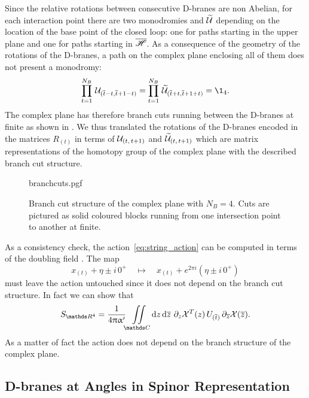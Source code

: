 Since the relative rotations between consecutive D-branes are non Abelian, for each interaction point there are two monodromies \cU and $\widetilde{\mathcal{U}}$ depending on the location of the base point of the closed loop: one for paths starting in the upper plane \ccH and one for paths starting in $\overline{\mathscr{H}}$.
As a consequence of the geometry of the rotations of the D-branes, a path on the complex plane enclosing all of them does not present a monodromy:
\begin{equation}
  \finiteprod{t}{1}{N_B}\,
  \cU_{(\bart - t, \bart + 1 - t)}
  =
  \finiteprod{t}{1}{N_B}\,
  \tcU_{(\bart + t, \bart + 1 + t)}
  =
  \1_4.
  \label{eq:homotopy_rep}
\end{equation}
The complex plane has therefore branch cuts running between the D-branes at finite as shown in .
We thus translated the rotations of the D-branes encoded in the matrices $R_{(t)}$ in terms of $\mathcal{U}_{(t,\, t+1)}$ and $\widetilde{\mathcal{U}}_{(t,\, t+1)}$ which are matrix representations of the homotopy group of the complex plane with the described branch cut structure.

\begin{figure}[tbp]
  \centering
  {branchcuts.pgf}
  \caption{%
    Branch cut structure of the complex plane with $N_B = 4$.
    Cuts are pictured as solid coloured blocks running from one intersection point to another at finite.
  }
  \label{fig:finite_cuts}
\end{figure}

As a consistency check, the action~\eqref{eq:string_action} can be computed in terms of the doubling field \cX.
The map
\begin{equation}
  x_{(t)} + \eta \pm i\, 0^+
  \quad
  \mapsto
  \quad
  x_{(t)} + e^{2 \pi i}( \eta \pm i\, 0^+)
\end{equation}
must leave the action untouched since it does not depend on the branch cut structure.
In fact we can show that
\begin{equation}
  S_{\R^4}
  =
  \frac{1}{4 \pi \ap}
  \iint\limits_{\C}
  \dd{z} \dd{\barz}\,
  \ipd{z} \cX^T(z)\,
  U_{(\bart)}\,
  \ipd{\barz} \cX(\barz).
\end{equation}
As a matter of fact the action does not depend on the branch structure of the complex plane.


\subsection{D-branes at Angles in Spinor Representation}

